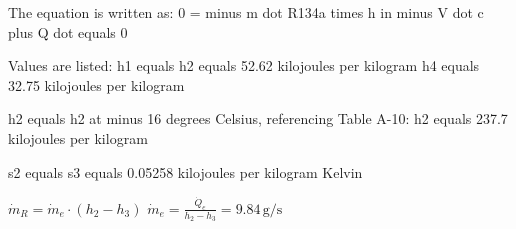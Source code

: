 The equation is written as:  
0 = minus m dot R134a times h in minus V dot c plus Q dot equals 0  

Values are listed:  
h1 equals h2 equals 52.62 kilojoules per kilogram  
h4 equals 32.75 kilojoules per kilogram  

h2 equals h2 at minus 16 degrees Celsius, referencing Table A-10:  
h2 equals 237.7 kilojoules per kilogram  

s2 equals s3 equals 0.05258 kilojoules per kilogram Kelvin

\( \dot{m}_{R} = \dot{m}_{e} \cdot (h_{2} - h_{3}) \)  
\( \dot{m}_{e} = \frac{\dot{Q}_{e}}{h_{2} - h_{3}} = 9.84 \, \text{g/s} \)